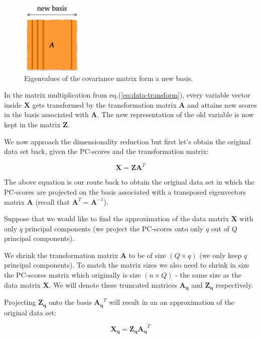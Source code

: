\documentclass[10pt,twocolumn]{article}
\begin{document}
\begin{figure}
\centering\includegraphics[width=3cm]{new-basis.png}
\caption{Eigenvalues of the covariance matrix form a new basis.}
\label{fig:new-basis}
\end{figure}


In the matrix multiplication from eq.(\ref{eq:data-transform}), every variable vector inside $\bm{X}$ gets transformed by the transformation matrix $\bm{A}$ and attains new scores in the basis associated with $\bm{A}$. The new representation of the old variable is now kept in the matrix $\bm{Z}$.

We now approach the dimensionality reduction but first let's obtain the original data set back, given the PC-scores and the transformation matrix:

\begin{equation}
\bm{X} = \bm{Z} \bm{A}^T
\end{equation}

The above equation is our route back to obtain the original data set in which the PC-scores are projected on the basis associated with a transposed eigenvectors matrix $\bm{A}$ (recall that $\bm{A}^T = \bm{A}^{-1}$).

Suppose that we would like to find the approximation of the data matrix $\bm{X}$ with only $q$ principal components (we project the PC-scores onto only $q$ out of $Q$ principal components).

We shrink the transformation matrix $\bm{A}$ to be of size $(Q \times q)$ (we only keep $q$ principal components). To match the matrix sizes we also need to shrink in size the PC-scores matrix which originally is size $(n \times Q)$ - the same size as the data matrix $\bm{X}$. We will denote these truncated matrices $\bm{A_q}$ and $\bm{Z_q}$ respectively.

Projecting $\bm{Z_q}$ onto the basis $\bm{A_q}^T$ will result in an an approximation of the original data set:

\begin{equation}
\bm{X_q} = \bm{Z_q} \bm{A_q}^T
\end{equation}
\end{document}
